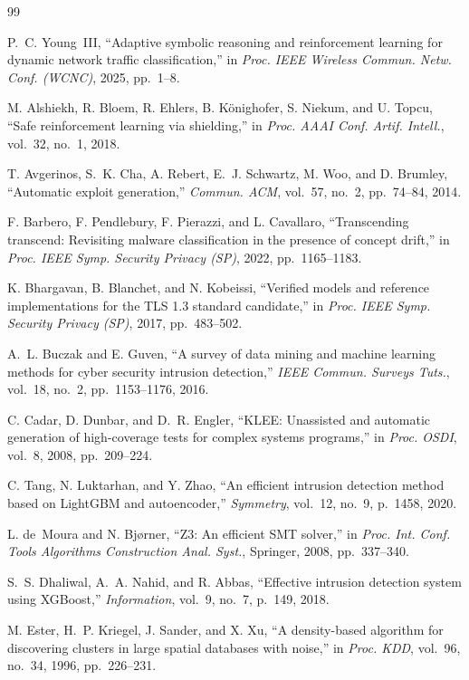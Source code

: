 \documentclass[12pt, letterpaper, oneside]{report}
\begin{document}
\begin{thebibliography}{99}

P.~C. Young~III, ``Adaptive symbolic reasoning and reinforcement learning for dynamic network traffic classification,'' in \textit{Proc. IEEE Wireless Commun. Netw. Conf. (WCNC)}, 2025, pp.~1--8.

M. Alshiekh, R. Bloem, R. Ehlers, B. K{\"o}nighofer, S. Niekum, and U. Topcu, ``Safe reinforcement learning via shielding,'' in \textit{Proc. AAAI Conf. Artif. Intell.}, vol.~32, no.~1, 2018.

T. Avgerinos, S.~K. Cha, A. Rebert, E.~J. Schwartz, M. Woo, and D. Brumley, ``Automatic exploit generation,'' \textit{Commun. ACM}, vol.~57, no.~2, pp.~74--84, 2014.

F. Barbero, F. Pendlebury, F. Pierazzi, and L. Cavallaro, ``Transcending transcend: Revisiting malware classification in the presence of concept drift,'' in \textit{Proc. IEEE Symp. Security Privacy (SP)}, 2022, pp.~1165--1183.

K. Bhargavan, B. Blanchet, and N. Kobeissi, ``Verified models and reference implementations for the TLS 1.3 standard candidate,'' in \textit{Proc. IEEE Symp. Security Privacy (SP)}, 2017, pp.~483--502.

A.~L. Buczak and E. Guven, ``A survey of data mining and machine learning methods for cyber security intrusion detection,'' \textit{IEEE Commun. Surveys Tuts.}, vol.~18, no.~2, pp.~1153--1176, 2016.

C. Cadar, D. Dunbar, and D.~R. Engler, ``KLEE: Unassisted and automatic generation of high-coverage tests for complex systems programs,'' in \textit{Proc. OSDI}, vol.~8, 2008, pp.~209--224.

C. Tang, N. Luktarhan, and Y. Zhao, ``An efficient intrusion detection method based on LightGBM and autoencoder,'' \textit{Symmetry}, vol.~12, no.~9, p.~1458, 2020.

L. de~Moura and N. Bj{\o}rner, ``Z3: An efficient SMT solver,'' in \textit{Proc. Int. Conf. Tools Algorithms Construction Anal. Syst.}, Springer, 2008, pp.~337--340.

S.~S. Dhaliwal, A.~A. Nahid, and R. Abbas, ``Effective intrusion detection system using XGBoost,'' \textit{Information}, vol.~9, no.~7, p.~149, 2018.

M. Ester, H.~P. Kriegel, J. Sander, and X. Xu, ``A density-based algorithm for discovering clusters in large spatial databases with noise,'' in \textit{Proc. KDD}, vol.~96, no.~34, 1996, pp.~226--231.


\end{thebibliography}
\end{document}

